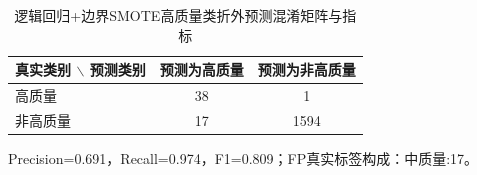 \begin{table}[htbp]
\centering
\caption{逻辑回归+边界SMOTE高质量类折外预测混淆矩阵与指标}
\label{tab:high-quality-confusion}
\small
\begin{tabular}{lcc}
\toprule
真实类别 $\backslash$ 预测类别 & 预测为高质量 & 预测为非高质量 \\
\midrule
高质量 & 38 & 1 \\
非高质量 & 17 & 1594 \\
\bottomrule
\end{tabular}
\vspace{2pt}
\parbox{0.92\textwidth}{\footnotesize Precision=0.691，Recall=0.974，F1=0.809；FP真实标签构成：中质量:17。}
\end{table}
